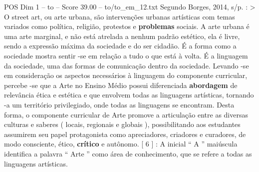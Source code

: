 \begin{textsample}{POS Dim 1 – to – Score 39.00 – to/to\_em\_12.txt}
Segundo Borges, 2014, s/p. : > O street art, ou arte urbana, são intervenções urbanas artísticas com temas variados como política, religião, protestos e \textbf{problemas} sociais.
A arte urbana é uma arte marginal, e não está atrelada a nenhum padrão estético, ela é livre, sendo a expressão máxima da sociedade e do ser cidadão.
É a forma como a sociedade mostra sentir -se em relação a tudo o que está à volta.
É a linguagem da sociedade, uma das formas de comunicação dentro da sociedade.
Levando -se em consideração os aspectos necessários à linguagem do componente curricular, percebe -se que a Arte no Ensino Médio possui diferenciada \textbf{abordagem} de relevância ética e estética e que envolvem todas as linguagens artísticas, tornando -a um território privilegiado, onde todas as linguagens se encontram.
Desta forma, o componente curricular de Arte promove a articulação entre as diversas culturas e saberes ( locais, regionais e globais ), possibilitando aos estudantes assumirem seu papel protagonista como apreciadores, criadores e curadores, de modo consciente, ético, \textbf{crítico} e autônomo. [ 6 ] : A inicial “ A ” maiúscula identifica a palavra “ Arte ” como área de conhecimento, que se refere a todas as linguagens artísticas.

\end{textsample}
